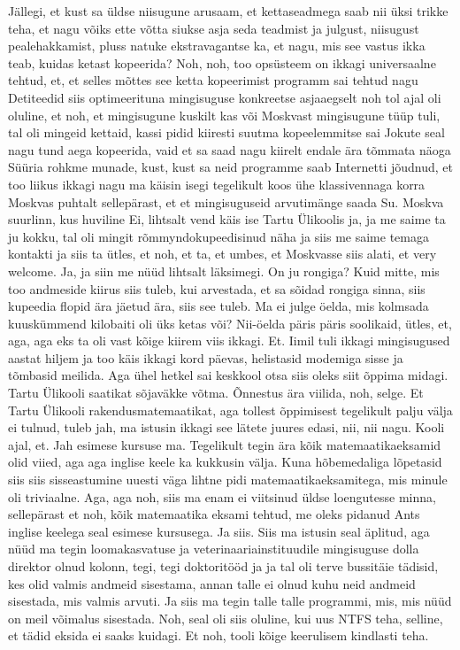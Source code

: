 Jällegi, et kust sa üldse niisugune arusaam, et kettaseadmega saab nii üksi trikke teha, et nagu võiks ette võtta siukse asja seda teadmist ja julgust, niisugust pealehakkamist, pluss natuke ekstravagantse ka, et nagu, mis see vastus ikka teab, kuidas ketast kopeerida?
Noh, noh, too opsüsteem on ikkagi universaalne tehtud, et, et selles mõttes see ketta kopeerimist programm sai tehtud nagu Detiteedid siis optimeerituna mingisuguse konkreetse asjaaegselt noh tol ajal oli oluline, et noh, et mingisugune kuskilt kas või Moskvast mingisugune tüüp tuli, tal oli mingeid kettaid, kassi pidid kiiresti suutma kopeelemmitse sai Jokute seal nagu tund aega kopeerida, vaid et sa saad nagu kiirelt endale ära tõmmata näoga Süüria rohkme munade, kust, kust sa neid programme saab Internetti jõudnud, et too liikus ikkagi nagu ma käisin isegi tegelikult koos ühe klassivennaga korra Moskvas puhtalt sellepärast, et et mingisuguseid arvutimänge saada Su.
Moskva suurlinn, kus huviline
Ei, lihtsalt vend käis ise Tartu Ülikoolis ja, ja me saime ta ju kokku, tal oli mingit rõmmyndokupeedisinud näha ja siis me saime temaga kontakti ja siis ta ütles, et noh, et ta, et umbes, et Moskvasse siis alati, et very welcome. Ja, ja siin me nüüd lihtsalt läksimegi.
On ju rongiga?
Kuid mitte, mis too andmeside kiirus siis tuleb, kui arvestada, et sa sõidad rongiga sinna, siis kupeedia flopid ära jäetud ära, siis see tuleb.
Ma ei julge öelda, mis kolmsada kuuskümmend kilobaiti oli üks ketas või? Nii-öelda päris päris soolikaid, ütles, et, aga, aga eks ta oli vast kõige kiirem viis ikkagi.
Et.
Iimil tuli ikkagi mingisugused aastat hiljem ja too käis ikkagi kord päevas, helistasid modemiga sisse ja tõmbasid meilida.
Aga ühel hetkel sai keskkool otsa siis oleks siit õppima midagi.
Tartu Ülikooli saatikat sõjaväkke võtma. Õnnestus ära viilida, noh, selge. Et Tartu Ülikooli rakendusmatemaatikat, aga tollest õppimisest tegelikult palju välja ei tulnud, tuleb jah, ma istusin ikkagi see lätete juures edasi, nii, nii nagu.
Kooli ajal, et.
Jah esimese kursuse ma.
Tegelikult tegin ära kõik matemaatikaeksamid olid viied, aga aga inglise keele ka kukkusin välja. Kuna hõbemedaliga lõpetasid siis siis sisseastumine uuesti väga lihtne pidi matemaatikaeksamitega, mis minule oli triviaalne. Aga, aga noh, siis ma enam ei viitsinud üldse loengutesse minna, sellepärast et noh, kõik matemaatika eksami tehtud, me oleks pidanud Ants inglise keelega seal esimese kursusega.
Ja siis.
Siis ma istusin seal äplitud, aga nüüd ma tegin loomakasvatuse ja veterinaariainstituudile mingisuguse dolla direktor olnud kolonn, tegi, tegi doktoritööd ja ja tal oli terve bussitäie tädisid, kes olid valmis andmeid sisestama, annan talle ei olnud kuhu neid andmeid sisestada, mis valmis arvuti. Ja siis ma tegin talle talle programmi, mis, mis nüüd on meil võimalus sisestada. Noh, seal oli siis oluline, kui uus NTFS teha, selline, et tädid eksida ei saaks kuidagi. Et noh, tooli kõige keerulisem kindlasti teha.
